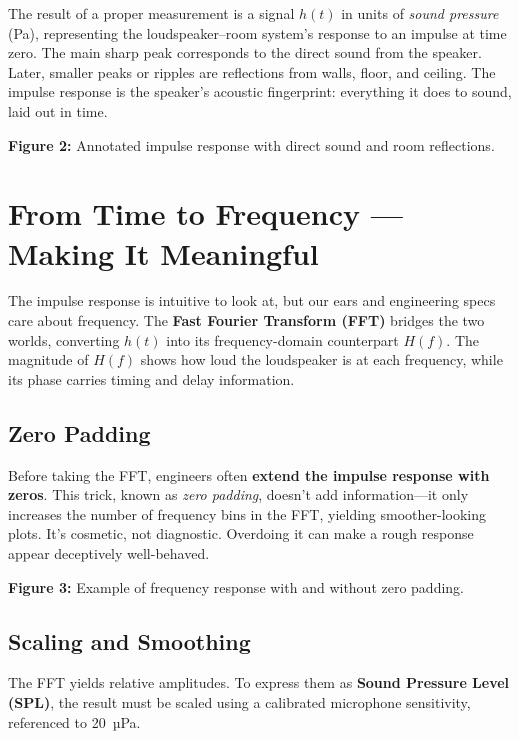 \documentclass[12pt,a4paper]{article}
\begin{document}
The result of a proper measurement is a signal \( h(t) \) in units of \emph{sound pressure} (Pa), representing the loudspeaker–room system’s response to an impulse at time zero. The main sharp peak corresponds to the direct sound from the speaker. Later, smaller peaks or ripples are reflections from walls, floor, and ceiling. The impulse response is the speaker’s acoustic fingerprint: everything it does to sound, laid out in time.

\vspace{1em}
\noindent\textbf{Figure 2:} Annotated impulse response with direct sound and room reflections.

\section{From Time to Frequency --- Making It Meaningful}

The impulse response is intuitive to look at, but our ears and engineering specs care about frequency.  
The \textbf{Fast Fourier Transform (FFT)} bridges the two worlds, converting \( h(t) \) into its frequency-domain counterpart \( H(f) \). The magnitude of \( H(f) \) shows how loud the loudspeaker is at each frequency, while its phase carries timing and delay information.

\subsection*{Zero Padding}

Before taking the FFT, engineers often \textbf{extend the impulse response with zeros}. This trick, known as \emph{zero padding}, doesn’t add information—it only increases the number of frequency bins in the FFT, yielding smoother-looking plots. It’s cosmetic, not diagnostic. Overdoing it can make a rough response appear deceptively well-behaved.

\vspace{1em}
\noindent\textbf{Figure 3:} Example of frequency response with and without zero padding.

\subsection*{Scaling and Smoothing}

The FFT yields relative amplitudes. To express them as \textbf{Sound Pressure Level (SPL)}, the result must be scaled using a calibrated microphone sensitivity, referenced to 20~µPa.  
\end{document}
